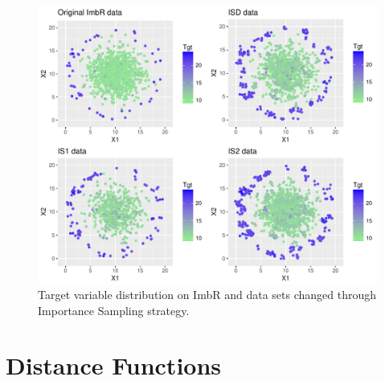 \documentclass[10pt,a4paper]{article}\usepackage[]{graphicx}\usepackage[]{color}
\makeatletter
\def\maxwidth{ %
  \ifdim\Gin@nat@width>\linewidth
    \linewidth
  \else
    \Gin@nat@width
  \fi
}
\newenvironment{knitrout}{}{} %
\makeatother
\begin{document}
\begin{knitrout}\footnotesize
{}\color{fgcolor}\begin{figure}

{\centering \includegraphics[width=\maxwidth]{figures/UBL-IS_new_plot4-1} 

}

\caption[Target variable distribution on ImbR and data sets changed through Importance Sampling strategy]{Target variable distribution on ImbR and data sets changed through Importance Sampling strategy.}\label{fig:IS_new_plot4}
\end{figure}


\end{knitrout}


\section{Distance Functions}\label{sec:distFunc}
\end{document}
